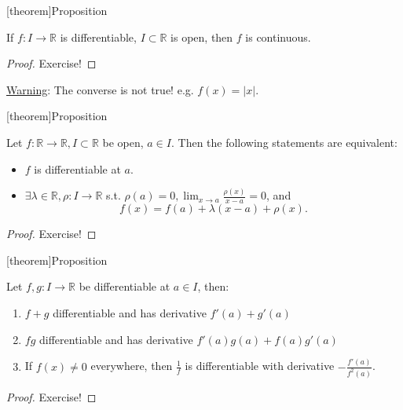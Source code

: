 \documentclass[12pt]{report}
\theoremstyle{definition}
\begin{document}
[theorem]{Proposition}
\begin{differentiable means continuous}
    If $f:I\rightarrow{}\mathbb{R}$ is differentiable, $I \subset \mathbb{R}$ is open, 
    then $f$ is continuous.
\end{differentiable means continuous}

\begin{proof}
    Exercise!
\end{proof}

\underline{Warning}: The converse is not true! e.g. $f(x) = |x|$.

[theorem]{Proposition}
\begin{construct secant around a}
    Let $f:\mathbb{R}\rightarrow{}\mathbb{R}, I \subset \mathbb{R}$ be open, $a \in I$.
    Then the following statements are equivalent:
    \begin{itemize}
            \item $f$ is differentiable at $a$.
            \item $\exists \lambda \in \mathbb{R}, \rho:I\rightarrow{}\mathbb{R}$
            s.t. $\rho (a) = 0, \lim_{x\rightarrow{}a} \frac{\rho(x)}{x-a} = 0$, and\[
                    f(x) = f(a) + \lambda(x-a) + \rho(x).
                \]
    \end{itemize}
\end{construct secant around a}

\begin{proof}
    Exercise!
\end{proof}

[theorem]{Proposition}
\begin{differentiation properties}
    Let $f,g: I\rightarrow{}\mathbb{R}$ be differentiable at $a \in I$, then:
    \begin{enumerate}
        \item $f+g$ differentiable and has derivative $f'(a) + g'(a)$
        \item $fg$ differentiable and has derivative $f'(a)g(a) + f(a)g'(a)$
        \item If $f(x) \neq 0$ everywhere, then $\frac{1}{f}$ is differentiable
            with derivative $-\frac{f'(a)}{f^{2}(a)}$.
    \end{enumerate}
\end{differentiation properties}

\begin{proof}
    Exercise!
\end{proof}
\end{document}
